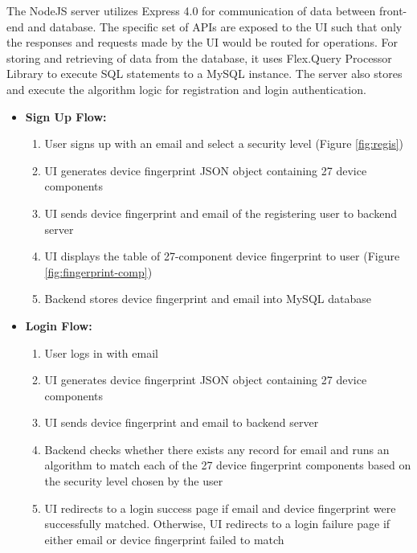 \documentclass{acm_proc_article-sp}
\begin{document}
The NodeJS server utilizes Express 4.0 for communication of data between front-end and database. The specific set of APIs are exposed to the UI such that only the responses and requests made by the UI would be routed for operations. For storing and retrieving of data from the database, it uses Flex.Query Processor Library to execute SQL statements to a MySQL instance. The server also stores and execute the algorithm logic for registration and login authentication. 


\begin{itemize}
    \item \textbf{Sign Up Flow:}
        \begin{enumerate}
            \item User signs up with an email and select a security level (Figure \ref{fig:regis})
            \item UI generates device fingerprint JSON object containing 27 device components
            \item UI sends device fingerprint and email of the registering user to backend server  
            \item UI displays the table of 27-component device fingerprint to user (Figure \ref{fig:fingerprint-comp})
            \item Backend stores device fingerprint and email into MySQL database
        \end{enumerate}

    \item \textbf{Login Flow:}
        \begin{enumerate}
            \item User logs in with email  
            \item UI generates device fingerprint JSON object containing 27 device components
            \item UI sends device fingerprint and email to backend server
            \item Backend checks whether there exists any record for email and runs an algorithm to match each of the 27 device fingerprint components based on the security level chosen by the user
            \item  UI redirects to a login success page if email and device fingerprint were successfully matched. Otherwise, UI redirects to a login failure page if either email or device fingerprint failed to match
        \end{enumerate}
\end{itemize}
\end{document}
